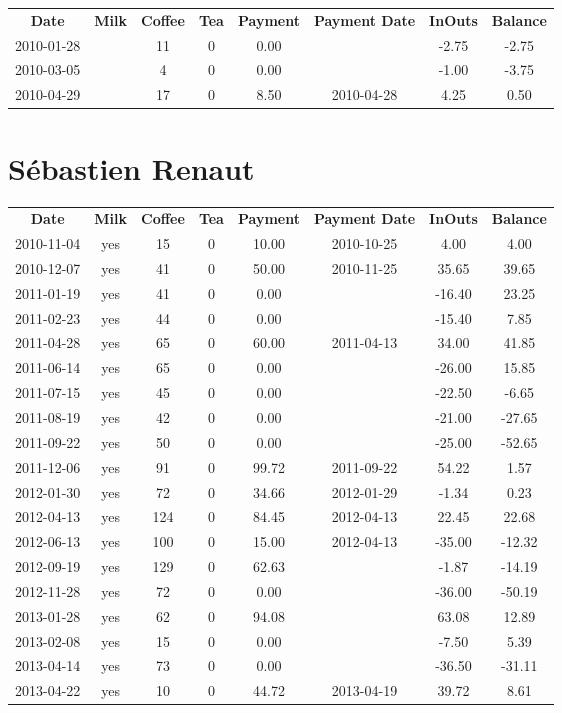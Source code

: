 \begin{center}
\begin{tabular}{cccccccc}
\textbf{Date} & \textbf{Milk} & \textbf{Coffee} & \textbf{Tea} & \textbf{Payment} & \textbf{Payment Date} & \textbf{InOuts} & \textbf{Balance} \\
2010-01-28 &  & 11 & 0 & 0.00 &  & -2.75 & -2.75\\ 
2010-03-05 &  &  4 & 0 & 0.00 &  & -1.00 & -3.75\\ 
2010-04-29 &  & 17 & 0 & 8.50 & 2010-04-28 &  4.25 &  0.50
\end{tabular}
\end{center}

\section{S\'ebastien Renaut}

\begin{center}
\begin{tabular}{cccccccc}
\textbf{Date} & \textbf{Milk} & \textbf{Coffee} & \textbf{Tea} & \textbf{Payment} & \textbf{Payment Date} & \textbf{InOuts} & \textbf{Balance} \\
2010-11-04 & yes &  15 & 0 &  10.00 & 2010-10-25 &   4.00 &   4.00\\ 
2010-12-07 & yes &  41 & 0 &  50.00 & 2010-11-25 &  35.65 &  39.65\\ 
2011-01-19 & yes &  41 & 0 &   0.00 &  & -16.40 &  23.25\\ 
2011-02-23 & yes &  44 & 0 &   0.00 &  & -15.40 &   7.85\\ 
2011-04-28 & yes &  65 & 0 &  60.00 & 2011-04-13 &  34.00 &  41.85\\ 
2011-06-14 & yes &  65 & 0 &   0.00 &  & -26.00 &  15.85\\ 
2011-07-15 & yes &  45 & 0 &   0.00 &  & -22.50 &  -6.65\\ 
2011-08-19 & yes &  42 & 0 &   0.00 &  & -21.00 & -27.65\\ 
2011-09-22 & yes &  50 & 0 &   0.00 &  & -25.00 & -52.65\\ 
2011-12-06 & yes &  91 & 0 &  99.72 & 2011-09-22 &  54.22 &   1.57\\ 
2012-01-30 & yes &  72 & 0 &  34.66 & 2012-01-29 &  -1.34 &   0.23\\ 
2012-04-13 & yes & 124 & 0 &  84.45 & 2012-04-13 &  22.45 &  22.68\\ 
2012-06-13 & yes & 100 & 0 &  15.00 & 2012-04-13 & -35.00 & -12.32\\ 
2012-09-19 & yes & 129 & 0 &  62.63 &  &  -1.87 & -14.19\\ 
2012-11-28 & yes &  72 & 0 &   0.00 &  & -36.00 & -50.19\\ 
2013-01-28 & yes &  62 & 0 &  94.08 &  &  63.08 &  12.89\\ 
2013-02-08 & yes &  15 & 0 &   0.00 &  &  -7.50 &   5.39\\ 
2013-04-14 & yes &  73 & 0 &   0.00 &  & -36.50 & -31.11\\ 
2013-04-22 & yes &  10 & 0 &  44.72 & 2013-04-19 &  39.72 &   8.61
\end{tabular}
\end{center}

